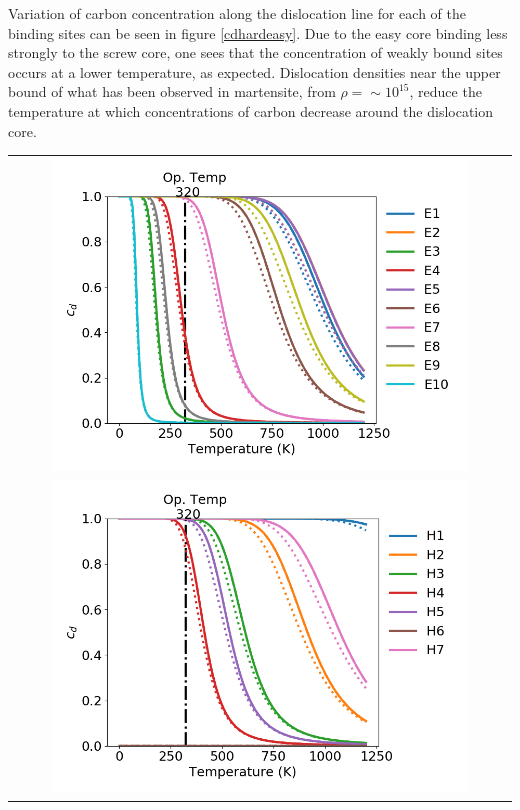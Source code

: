 \documentclass[a4paper,11pt]{article}
\begin{document}
Variation of carbon concentration along the dislocation line for each of the binding sites can
be seen in figure \ref{cdhardeasy}. Due to the easy core binding less strongly to the screw core,
one sees that the concentration of weakly bound sites occurs at a lower temperature, as
expected. Dislocation densities near the upper bound of what has been observed in martensite, from \(\rho =
   \sim10^{15}\), reduce the temperature at which concentrations of carbon decrease around the dislocation
core.  

\begin{table}	
    \begin{tabular}{c}
      	     \includegraphics[width=0.85\textwidth]{../Images/cd_easy_core_ferrite_sc.png}  \\
      	     \includegraphics[width=0.85\textwidth]{../Images/cd_hard_core_ferrite_sc.png}  \\


\end{tabular}
\end{table}
\end{document}
